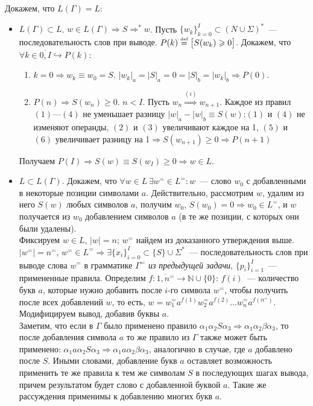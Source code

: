 \documentclass[a4paper]{article}
\def\eqdef{\overset{\mbox{\tiny def}}{=}}
\begin{document}
Докажем, что $L(\Gamma)=L$:\begin{itemize}
\item $L(\Gamma)\subset L$. $w\in L(\Gamma)\Rightarrow S\Longrightarrow^* w$. Пусть $\{w_k\}_{k=0}^I\subset (N\cup \Sigma)^*$~--- последовательность слов при выводе.\newline
$P(k)\eqdef\big[S(w_k)\geqslant 0\big]$. Докажем, что $\forall k\in\overline{0,I}\hookrightarrow P(k)$:\begin{enumerate}[1.]
\item $k=0\Rightarrow w_k\equiv w_0=S$. $|w_k|_a=|S|_a=0=|S|_b=|w_k|_b\Rightarrow P(0)$.
\item $P(n)\Rightarrow S(w_n)\geqslant 0$. $n<I$. Пусть $w_n\overset{(i)}{\Longrightarrow}w_{n+1}$. Каждое из правил $(1)$---$(4)$ не уменьшает разницу $|w|_a-|w|_b\equiv S(w)$:\newline$(1)$ и $(4)$ не изменяют операнды, $(2)$ и $(3)$ увеличивают каждое на 1, $(5)$ и $(6)$ увеличивает разницу на 1$\Rightarrow S(w_{n+1})\geqslant 0\Rightarrow P(n+1)$
\end{enumerate}
Получаем $P(I)\Rightarrow S(w)\equiv S(w_I)\geqslant 0\Rightarrow w\in L$.
\item $L\subset L(\Gamma)$. Докажем, что $\forall w\in L\,\exists w^=\in L^=\colon w$~--- слово $w_0$ с добавленными в некоторые позиции символами $a$. Действительно, рассмотрим $w$, удалим из него $S(w)$ любых символов $a$, получим $w_0$, $S(w_0)=0\Rightarrow w_0\in L^=$, и $w$ получается из $w_0$ добавлением символов $a$ (в те же позиции, с которых они были удалены).
\\[5pt]
\def\neqv{n^=}
\def\weqv{w^=}
\def\ieq{^=}
Фиксируем $w\in L$, $|w|=n$; $w^=$ найдем из доказанного утверждения выше. $|w^=|=\neqv$, $w^=\in L^=\Rightarrow \exists \{x_i\}^I_{i=0}\subset\{S\}\cup \Sigma^*$~--- последовательность слов при выводе слова $w^=$ в грамматике $\Gamma^=$ {\em из предыдущей задачи}, $\{p_i\}_{i=1}^I$~--- примененные правила.\newline
Определим $f\colon \overline{1,\neqv}\longrightarrow {\mathbb N}\cup\{0\}$: $f(i)$~--- количество букв $a$, которые нужно добавить после $i$-го символа $\weqv$, чтобы получить после всех добавлений $w$, то есть, $w=\weqv_1a^{f(1)}\weqv_2a^{f(2)}...\weqv_na^{f(\neqv)}$.
\\[5pt]
Модифицируем вывод, добавив буквы $a$.
\\[5pt]
Заметим, что если в $\Gamma$ было применено правило $\alpha_1\alpha_2S\alpha_3\Longrightarrow\alpha_1\alpha_2\beta\alpha_3$, то после добавления символа $a$ то же правило из $\Gamma$ также может быть применено: $\alpha_1a\alpha_2S\alpha_3\Longrightarrow\alpha_1a\alpha_2\beta\alpha_3$, аналогично в случае, где $a$ добавлено после $S$. Иными словами, добавление букв $a$ оставляет возможность применить те же правила к тем же символам $S$ в последующих шагах вывода, причем результатом будет слово с добавленной буквой $a$. Такие же рассуждения применимы к добавлению многих букв $a$.

\end{itemize}
\end{document}

